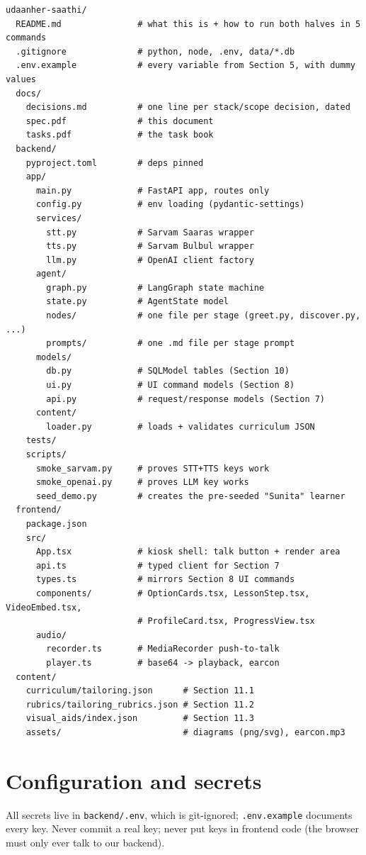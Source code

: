 \documentclass[11pt]{article}
\newcommand{\code}[1]{\texttt{#1}}
\begin{document}
\begin{verbatim}
udaanher-saathi/
  README.md               # what this is + how to run both halves in 5 commands
  .gitignore              # python, node, .env, data/*.db
  .env.example            # every variable from Section 5, with dummy values
  docs/
    decisions.md          # one line per stack/scope decision, dated
    spec.pdf              # this document
    tasks.pdf             # the task book
  backend/
    pyproject.toml        # deps pinned
    app/
      main.py             # FastAPI app, routes only
      config.py           # env loading (pydantic-settings)
      services/
        stt.py            # Sarvam Saaras wrapper
        tts.py            # Sarvam Bulbul wrapper
        llm.py            # OpenAI client factory
      agent/
        graph.py          # LangGraph state machine
        state.py          # AgentState model
        nodes/            # one file per stage (greet.py, discover.py, ...)
        prompts/          # one .md file per stage prompt
      models/
        db.py             # SQLModel tables (Section 10)
        ui.py             # UI command models (Section 8)
        api.py            # request/response models (Section 7)
      content/
        loader.py         # loads + validates curriculum JSON
    tests/
    scripts/
      smoke_sarvam.py     # proves STT+TTS keys work
      smoke_openai.py     # proves LLM key works
      seed_demo.py        # creates the pre-seeded "Sunita" learner
  frontend/
    package.json
    src/
      App.tsx             # kiosk shell: talk button + render area
      api.ts              # typed client for Section 7
      types.ts            # mirrors Section 8 UI commands
      components/         # OptionCards.tsx, LessonStep.tsx, VideoEmbed.tsx,
                          # ProfileCard.tsx, ProgressView.tsx
      audio/
        recorder.ts       # MediaRecorder push-to-talk
        player.ts         # base64 -> playback, earcon
  content/
    curriculum/tailoring.json      # Section 11.1
    rubrics/tailoring_rubrics.json # Section 11.2
    visual_aids/index.json         # Section 11.3
    assets/                        # diagrams (png/svg), earcon.mp3
\end{verbatim}

\section{Configuration and secrets}
\label{sec:config}

All secrets live in \code{backend/.env}, which is git-ignored; \code{.env.example} documents every key. Never commit a real key; never put keys in frontend code (the browser must only ever talk to our backend).
\end{document}
